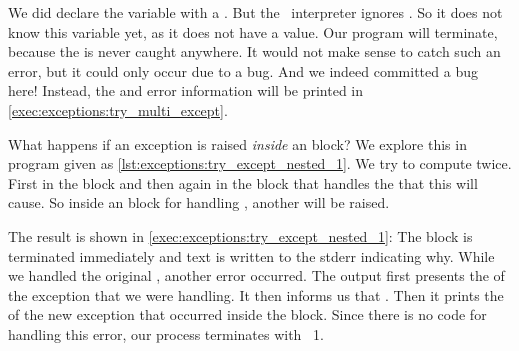 We did declare the variable with a .
But the \python\ interpreter ignores .
So it does not know this variable yet, as it does not have a value.
Our program will terminate, because the  is never caught anywhere.
It would not make sense to catch such an error, but it could only occur due to a bug.
And we indeed committed a bug here!
Instead, the  and error information will be printed in \cref{exec:exceptions:try_multi_except}.%
%
%
%
\FloatBarrier%
\endhsection%
%
%
%
%
%
%
\begin{sloppypar}%
What happens if an exception is raised \emph{inside} an  block?
We explore this in program  given as \cref{lst:exceptions:try_except_nested_1}.
We try to compute  twice.
First in the  block and then again in the  block that handles the  that this will cause.
So inside an  block for handling , another  will be raised.%
\end{sloppypar}%
%
The result is shown in \cref{exec:exceptions:try_except_nested_1}:
The  block is terminated immediately and text is written to the \gls{stderr} indicating why.
While we handled the original , another error occurred.
The output first presents the  of the exception that we were handling.
It then informs us that .
Then it prints the  of the new exception that occurred inside the  block.
Since there is no code for handling this error, our process terminates with ~1.

